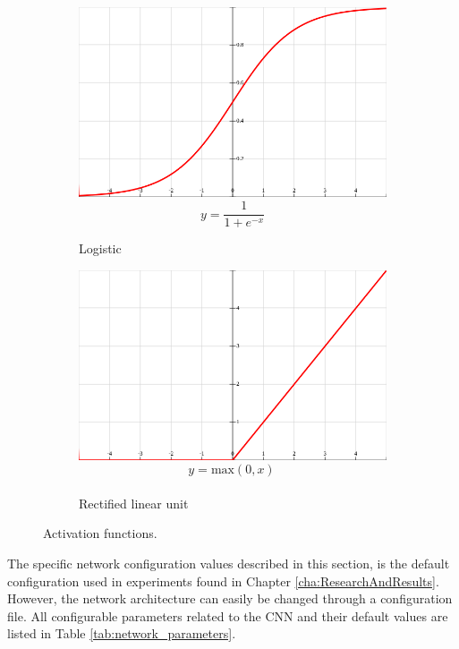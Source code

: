 \begin{figure}[h]
\begin{subfigure}{0.45\textwidth}
\includegraphics[width=\linewidth]{figs/sigmoid2.png}
$$ y = \frac{1}{1+ e^{-x}}$$
\caption{Logistic} \label{fig:activation_sigmoid}
\end{subfigure}
\hspace*{\fill} %
\begin{subfigure}{0.45\textwidth}
\includegraphics[width=\linewidth]{figs/relu2.png}
$$ y = \text{max}(0, x) \frac{}{}$$
\caption{Rectified linear unit} \label{fig:activation_relu}
\end{subfigure}
\hspace*{\fill} %
\caption[Activation functions]{Activation functions.} \label{fig:activation_functions}
\end{figure}


The specific network configuration values described in this section, is the default configuration used in experiments found in Chapter \ref{cha:ResearchAndResults}. However, the network architecture can easily be changed through a configuration file. All configurable parameters related to the \ac{CNN} and their default values are listed in Table \ref{tab:network_parameters}.\\

